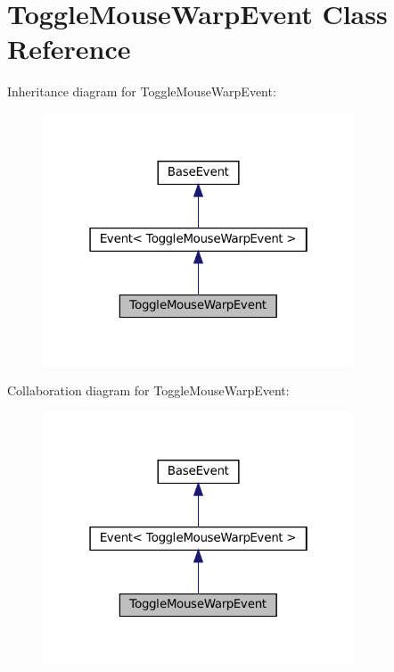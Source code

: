 \hypertarget{classToggleMouseWarpEvent}{}\section{Toggle\+Mouse\+Warp\+Event Class Reference}
\label{classToggleMouseWarpEvent}


Inheritance diagram for Toggle\+Mouse\+Warp\+Event\+:
\nopagebreak
\begin{figure}[H]
\begin{center}
\leavevmode
\includegraphics[width=262pt]{classToggleMouseWarpEvent__inherit__graph}
\end{center}
\end{figure}


Collaboration diagram for Toggle\+Mouse\+Warp\+Event\+:
\nopagebreak
\begin{figure}[H]
\begin{center}
\leavevmode
\includegraphics[width=262pt]{classToggleMouseWarpEvent__coll__graph}
\end{center}
\end{figure}

